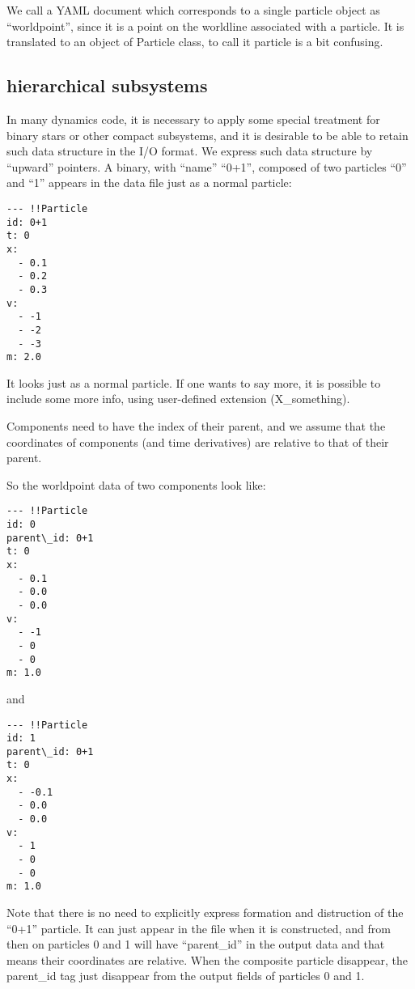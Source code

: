 \documentclass[12pt]{article}
\begin{document}
We call a YAML document which corresponds to a single particle object
as ``worldpoint'', since it is a point on the worldline associated
with a particle. It is translated to an object of Particle class, to
call it particle is a bit confusing.

\subsection{hierarchical subsystems}

In many dynamics code, it is necessary to apply some special treatment
for binary stars or other compact subsystems, and it is desirable to
be able to  retain such data structure in the I/O format. We express
such data structure by ``upward'' pointers. A binary, with ``name''
``0+1'', composed of two particles ``0'' and ``1'' appears in the data
file just as a normal particle:


\begin{verbatim}
--- !!Particle
id: 0+1
t: 0
x:
  - 0.1
  - 0.2
  - 0.3
v:
  - -1
  - -2
  - -3
m: 2.0
\end{verbatim}

It looks just as a normal particle. If one wants to say more, it is
possible to include some more info, using user-defined extension
(X\_something).

Components need to have the index of their parent, and we assume that
the coordinates of components (and time derivatives) are relative to
that of their parent.

So the worldpoint data of two components look like:

\begin{verbatim}
--- !!Particle
id: 0
parent\_id: 0+1
t: 0
x:
  - 0.1
  - 0.0
  - 0.0
v:
  - -1
  - 0
  - 0
m: 1.0
\end{verbatim}

and

\begin{verbatim}
--- !!Particle
id: 1
parent\_id: 0+1
t: 0
x:
  - -0.1
  - 0.0
  - 0.0
v:
  - 1
  - 0
  - 0
m: 1.0
\end{verbatim}


Note that there is no need to explicitly express formation and
distruction of the  ``0+1'' particle. It can just appear in the file
when it is constructed, and from then on particles 0 and 1 will have
``parent\_id'' in the output data and that means their coordinates are
relative. When the composite particle disappear, the parent\_id tag
just disappear from the output fields of particles 0 and 1.
\end{document}
